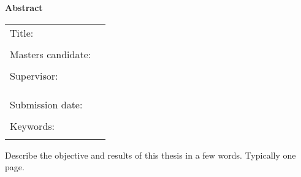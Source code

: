 \thispagestyle{plain}
\vspace*{11pt}
\begin{center}
	{\LARGE \textbf{\textsf{Abstract}}}
\end{center}

\bigskip

\begin{center}
	\begin{tabular}{p{3.2cm}p{9.6cm}}
		Title: & \thema \\
		 & \\
		Masters candidate: & \autor \\
		 & \\
		Supervisor: & \firma \\[1.1ex] & \prueferA  \\[.5ex]
		 &  \prueferB \\
		 & \\
		Submission date: & \abgabedatum \\
		 & \\
		Keywords: & \schlagworte \\
		 & \\
	\end{tabular}
\end{center}

\bigskip

\noindent

Describe the objective and results of this thesis in a few words.
Typically one page.